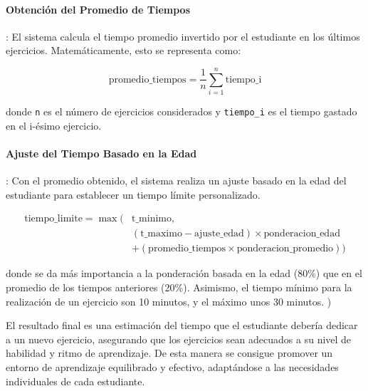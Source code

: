 \paragraph{Obtención del Promedio de Tiempos}: El sistema calcula el tiempo promedio invertido por el estudiante en los últimos ejercicios. Matemáticamente, esto se representa como:

\begin{equation} 
    \text{promedio\_tiempos} = \frac{1}{n} \sum_{i=1}^{n} \text{tiempo\_i}
\end{equation}
    
donde \texttt{n} es el número de ejercicios considerados y \texttt{tiempo\_i} es el tiempo gastado en el i-ésimo ejercicio.

\paragraph{Ajuste del Tiempo Basado en la Edad}: Con el promedio obtenido, el sistema realiza un ajuste basado en la edad del estudiante para establecer un tiempo límite personalizado. 

\begin{equation}
    \begin{split}
        \text{tiempo\_limite} = \max\Bigg( & \text{t\_minimo}, \\
        & \left( \text{t\_maximo} - \text{ajuste\_edad} \right) \times \text{ponderacion\_edad} \\
        & + \left( \text{promedio\_tiempos} \times \text{ponderacion\_promedio} \right) \Bigg)
    \end{split}
\end{equation}
    
donde se da más importancia a la ponderación basada en la edad (80\%) que en el promedio de los tiempos anteriores (20\%). Asimismo, el tiempo mínimo para la realización de un ejercicio son 10 minutos, y el máximo unos 30 minutos. )

El resultado final es una estimación del tiempo que el estudiante debería dedicar a un nuevo ejercicio, asegurando que los ejercicios sean adecuados a su nivel de habilidad y ritmo de aprendizaje. De esta manera se consigue promover un entorno de aprendizaje equilibrado y efectivo, adaptándose a las necesidades individuales de cada estudiante.

